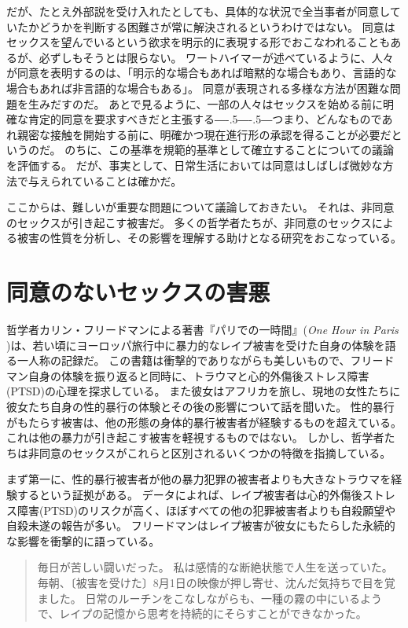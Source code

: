 \documentclass[paper=a4,book,openany]{jlreq}
\newcommand{\ig}[1]{}           %
\def\DDASH{―\kern-.5\zw―\kern-.5\zw―} %
\begin{document}
だが、たとえ外部説を受け入れたとしても、具体的な状況で全当事者が同意していたかどうかを判断する困難さが常に解決されるというわけではない。
同意はセックスを望んでいるという欲求を明示的に表現する形でおこなわれることもあるが、必ずしもそうとは限らない。
ワートハイマーが述べているように、人々が同意を表明するのは、「明示的な場合もあれば暗黙的な場合もあり、言語的な場合もあれば非言語的な場合もある」\citep[p.346]{wertheimer03:_consen_sexual_relat}。
同意が表現される多様な方法が困難な問題を生みだすのだ。
あとで見るように、一部の人々はセックスを始める前に明確な肯定的同意を要求すべきだと主張する{\DDASH}つまり、どんなものであれ親密な接触を開始する前に、明確かつ現在進行形の承認を得ることが必要だというのだ。
のちに、この基準を規範的基準として確立することについての議論を評価する。
だが、事実として、日常生活においては同意はしばしば微妙な方法で与えられていることは確かだ。

ここからは、難しいが重要な問題について議論しておきたい。
それは、非同意のセックスが引き起こす被害だ。
多くの哲学者たちが、非同意のセックスによる被害の性質を分析し、その影響を理解する助けとなる研究をおこなっている。

\section{同意のないセックスの害悪}

哲学者カリン・フリードマン\ig{Karyn L. Freedman}による著書『パリでの一時間』(\emph{One Hour in Paris} \citep{freedman14:_one_hour_paris})は、若い頃にヨーロッパ旅行中に暴力的なレイプ被害を受けた自身の体験を語る一人称の記録だ。
この書籍は衝撃的でありながらも美しいもので、フリードマン自身の体験を振り返ると同時に、トラウマと心的外傷後ストレス障害(PTSD)の心理を探求している。
また彼女はアフリカを旅し、現地の女性たちに彼女たち自身の性的暴行の体験とその後の影響について話を聞いた。
性的暴行がもたらす被害は、他の形態の身体的暴行被害者が経験するものを超えている。
これは他の暴力が引き起こす被害を軽視するものではない。
しかし、哲学者たちは非同意のセックスがこれらと区別されるいくつかの特徴を指摘している。

まず第一に、性的暴行被害者が他の暴力犯罪の被害者よりも大きなトラウマを経験するという証拠がある。
データによれば、レイプ被害者は心的外傷後ストレス障害(PTSD)のリスクが高く、ほぼすべての他の犯罪被害者よりも自殺願望や自殺未遂の報告が多い\citep[p.104]{wertheimer03:_consen_sexual_relat}。
フリードマン\ig{Karyn L. Freedman}はレイプ被害が彼女にもたらした永続的な影響を衝撃的に語っている。

\begin{quote}
毎日が苦しい闘いだった。
私は感情的な断絶状態で人生を送っていた。
毎朝、〔被害を受けた〕8月1日の映像が押し寄せ、沈んだ気持ちで目を覚ました。
日常のルーチンをこなしながらも、一種の霧の中にいるようで、レイプの記憶から思考を持続的にそらすことができなかった。
\citep{freedman14:_one_hour_paris}
\end{quote}
\end{document}
